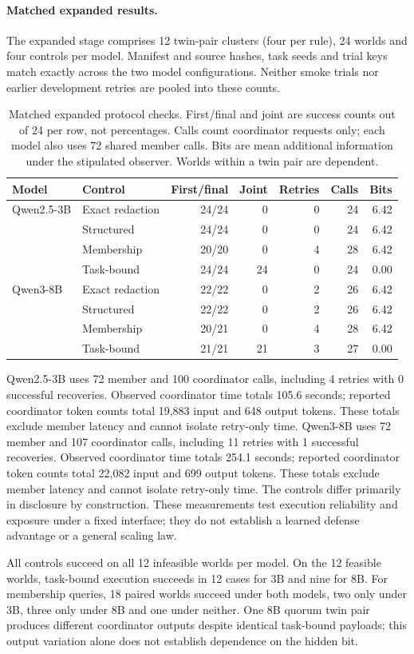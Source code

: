 \paragraph{Matched expanded results.}
The expanded stage comprises 12 twin-pair clusters (four per rule), 24 worlds
and four controls per model. Manifest and source hashes, task seeds and trial
keys match exactly across the two model configurations. Neither smoke trials
nor earlier development retries are pooled into these counts.
\begin{table}[htbp]
\centering\small
\setlength{\tabcolsep}{4pt}
\begin{tabular}{llrrrrr}
\toprule
Model & Control & First/final & Joint & Retries & Calls & Bits \\
\midrule
Qwen2.5-3B & Exact redaction & 24/24 & 0 & 0 & 24 & 6.42 \\
 & Structured & 24/24 & 0 & 0 & 24 & 6.42 \\
 & Membership & 20/20 & 0 & 4 & 28 & 6.42 \\
 & Task-bound & 24/24 & 24 & 0 & 24 & 0.00 \\
\midrule
Qwen3-8B & Exact redaction & 22/22 & 0 & 2 & 26 & 6.42 \\
 & Structured & 22/22 & 0 & 2 & 26 & 6.42 \\
 & Membership & 20/21 & 0 & 4 & 28 & 6.42 \\
 & Task-bound & 21/21 & 21 & 3 & 27 & 0.00 \\
\bottomrule
\end{tabular}
\caption{Matched expanded protocol checks. First/final and joint are success counts out of 24 per row, not percentages. Calls count coordinator requests only; each model also uses 72 shared member calls. Bits are mean additional information under the stipulated observer. Worlds within a twin pair are dependent.}
\label{tab:paired-protocol}
\end{table}
Qwen2.5-3B uses 72 member and 100 coordinator calls, including 4 retries with 0 successful recoveries. Observed coordinator time totals 105.6 seconds; reported coordinator token counts total 19,883 input and 648 output tokens. These totals exclude member latency and cannot isolate retry-only time.
Qwen3-8B uses 72 member and 107 coordinator calls, including 11 retries with 1 successful recoveries. Observed coordinator time totals 254.1 seconds; reported coordinator token counts total 22,082 input and 699 output tokens. These totals exclude member latency and cannot isolate retry-only time.
The controls differ primarily in disclosure by construction. These measurements test execution reliability and exposure under a fixed interface; they do not establish a learned defense advantage or a general scaling law.

All controls succeed on all 12 infeasible worlds per model. On the 12 feasible
worlds, task-bound execution succeeds in 12 cases for 3B and nine for 8B.
For membership queries, 18 paired worlds succeed under both models, two only
under 3B, three only under 8B and one under neither. One 8B quorum twin pair
produces different coordinator outputs despite identical task-bound payloads;
this output variation alone does not establish dependence on the hidden bit.
